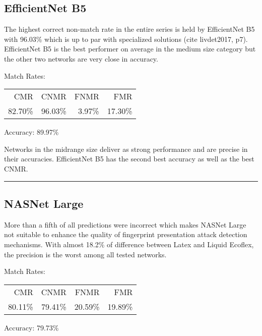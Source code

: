 \bigskip
\subsection{EfficientNet B5}

\begin{minipage}[c]{0.7\textwidth}

    The highest correct non-match rate in the entire series is held by EfficientNet B5 with 96.03\% which is up to par with specialized solutions (cite livdet2017, p7).
    EfficientNet B5 is the best performer on average in the medium size category but the other two networks are very close in accuracy.

    \medskip\noindent\centering Match Rates: 
    \begin{tabular}{ r  r  r  r |}
        CMR       & CNMR      & FNMR     & FMR     \\
        82.70\%   & 96.03\%   & 3.97\%   & 17.30\%  \\
    \end{tabular} \hspace{2mm} Accuracy: 89.97\%

\end{minipage}
\hfill
\begin{minipage}[c]{0.3\textwidth}
    \centering
    
\end{minipage}


\bigskip\noindent
Networks in the midrange size deliver as strong performance and are precise in their accuracies.
EﬀicientNet B5 has the second best accuracy as well as the best CNMR.

\bigskip\hrule\bigskip


\subsection{NASNet Large}

\begin{minipage}[c]{0.7\textwidth}
    More than a fifth of all predictions were incorrect which makes NASNet Large not suitable to enhance the quality of fingerprint presentation attack detection mechanisms.
    With almost 18.2\% of difference between Latex and Liquid Ecoflex, the precision is the worst among all tested networks.

    \medskip\noindent\centering Match Rates: 
    \begin{tabular}{ r  r  r  r |}
        CMR       & CNMR      & FNMR     & FMR     \\
        80.11\%   & 79.41\%   & 20.59\%  & 19.89\%  \\
    \end{tabular} \hspace{2mm} Accuracy: 79.73\%
\end{minipage}
\hfill
\begin{minipage}[t]{0.3\textwidth}
    \centering
    
\end{minipage}


